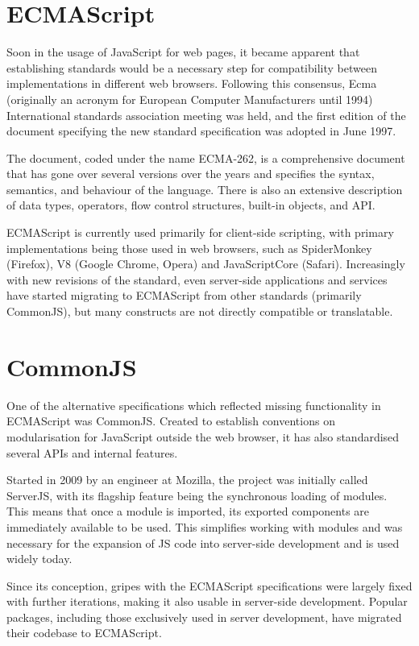 \section{ECMAScript}
Soon in the usage of JavaScript for web pages, it became apparent that
establishing standards would be a necessary step for compatibility between
implementations in different web browsers. Following this consensus, Ecma
(originally an acronym for European Computer Manufacturers until 1994)
International standards association meeting was held, and the first edition of
the document specifying the new standard specification was adopted in June 1997.

The document, coded under the name ECMA-262, is a comprehensive document that
has gone over several versions over the years and specifies the syntax,
semantics, and behaviour of the language. There is also an extensive description
of data types, operators, flow control structures, built-in objects, and API.

ECMAScript is currently used primarily for client-side scripting, with primary
implementations being those used in web browsers, such as SpiderMonkey
(Firefox), V8 (Google Chrome, Opera) and JavaScriptCore (Safari). Increasingly
with new revisions of the standard, even server-side applications and services
have started migrating to ECMAScript from other standards (primarily CommonJS),
but many constructs are not directly compatible or translatable.


\section{CommonJS}
One of the alternative specifications which reflected missing functionality in
ECMAScript was CommonJS. Created to establish conventions on modularisation for
JavaScript outside the web browser, it has also standardised several APIs and
internal features. 

Started in 2009 by an engineer at Mozilla, the project was initially called
ServerJS, with its flagship feature being the synchronous loading of modules.
This means that once a module is imported, its exported components are
immediately available to be used. This simplifies working with modules and was
necessary for the expansion of JS code into server-side development and is used
widely today. 

Since its conception, gripes with the ECMAScript specifications were largely
fixed with further iterations, making it also usable in server-side development.
Popular packages, including those exclusively used in server development, have
migrated their codebase to ECMAScript.


